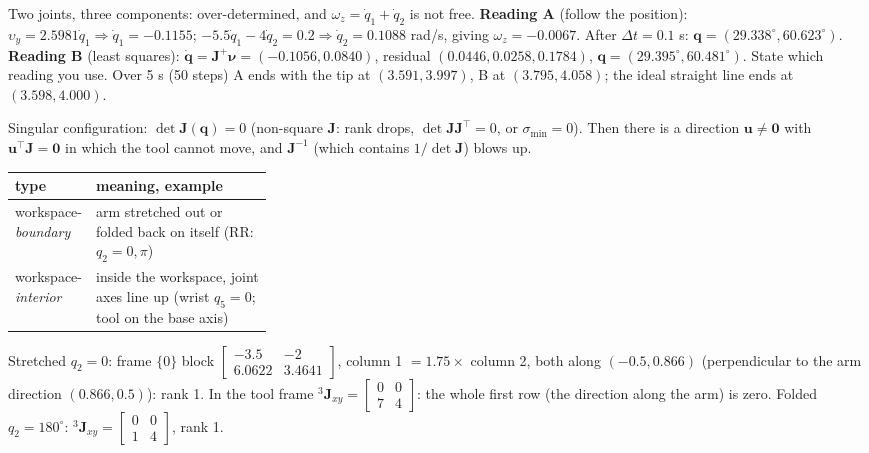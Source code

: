 \begin{multicols}{2}
\begin{worked}[notebook Question 4: $L=(3,4)$ m, $\mathbf q=(30^\circ,60^\circ)$, $\boldsymbol\nu=(0.2,-0.3,-0.2)$ (m/s, m/s, rad/s)]
Two joints, three components: over-determined, and $\omega_z=\dot q_1+\dot q_2$ is not free. \textbf{Reading A} (follow the position): $\upsilon_y=2.5981\dot q_1\Rightarrow\dot q_1=-0.1155$; $-5.5\dot q_1-4\dot q_2=0.2\Rightarrow\dot q_2=0.1088$ rad/s, giving $\omega_z=-0.0067$. After $\Delta t=0.1$ s: $\mathbf q=(29.338^\circ,60.623^\circ)$. \textbf{Reading B} (least squares): $\dot{\mathbf q}=\mathbf J^+\boldsymbol\nu=(-0.1056,0.0840)$, residual $(0.0446,0.0258,0.1784)$, $\mathbf q=(29.395^\circ,60.481^\circ)$. State which reading you use. Over 5 s (50 steps) A ends with the tip at $(3.591,3.997)$, B at $(3.795,4.058)$; the ideal straight line ends at $(3.598,4.000)$. \chk
\end{worked}

\begin{fbx}
Singular configuration: $\det\mathbf J(\mathbf q)=0$ (non-square $\mathbf J$: rank drops, $\det\mathbf J\mathbf J^\top=0$, or $\sigma_{\min}=0$). Then there is a direction $\mathbf u\neq\mathbf 0$ with $\mathbf u^\top\mathbf J=\mathbf 0$ in which the tool cannot move, and $\mathbf J^{-1}$ (which contains $1/\det\mathbf J$) blows up.
\begin{tabularx}{\linewidth}{@{}>{\raggedright\arraybackslash}p{0.3\linewidth}X@{}}
\toprule type & meaning, example\\\midrule
workspace-\emph{boundary} & arm stretched out or folded back on itself (RR: $q_2=0,\pi$)\\
workspace-\emph{interior} & inside the workspace, joint axes line up (wrist $q_5=0$; tool on the base axis)\\
\bottomrule
\end{tabularx}
\end{fbx}
\begin{worked}[planar RR $L=(3,4)$, $q_1=30^\circ$ at the two singular poses (notebook cell 46)]
Stretched $q_2=0$: frame $\{0\}$ block $\begin{bmatrix}-3.5&-2\\6.0622&3.4641\end{bmatrix}$, column 1 $=1.75\times$ column 2, both along $(-0.5,0.866)$ (perpendicular to the arm direction $(0.866,0.5)$): rank 1. In the tool frame ${}^3\mathbf J_{xy}=\begin{bmatrix}0&0\\7&4\end{bmatrix}$: the whole first row (the direction along the arm) is zero. Folded $q_2=180^\circ$: ${}^3\mathbf J_{xy}=\begin{bmatrix}0&0\\1&4\end{bmatrix}$, rank 1. \chk

\end{worked}
\end{multicols}
